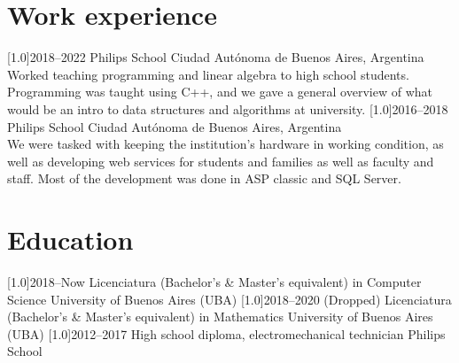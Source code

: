 \documentclass[espanol]{cv-style}     %
\begin{document}
\section{Work experience}
  \vspace{-0.2cm}
\begin{entrylist}
\entry
  {\scalebox{.8}[1.0]{2018--2022}}
  {Philips School}
  {Ciudad Autónoma de Buenos Aires, Argentina}
  {\\
  Worked teaching programming and linear algebra to high school students. Programming was taught
  using C++, and we gave a general overview of what would be an intro to data structures and
  algorithms at university.}
\vspace{-0.3cm}
\entry
  {\scalebox{.8}[1.0]{2016--2018}}
  {Philips School}
  {Ciudad Autónoma de Buenos Aires, Argentina}
  {\\
     We were tasked with keeping the institution's hardware in working condition, as
     well as developing web services for students and families as well as faculty and staff.
     Most of the development was done in ASP classic and SQL Server.}
\end{entrylist}
\section{Education}
  \vspace{-0.2cm}
\begin{entrylist}
\entry
{\scalebox{.8}[1.0]{2018--Now}}
{Licenciatura (Bachelor's \& Master's equivalent) in Computer Science}
{University of Buenos Aires (UBA)}
{}
\entry
{\scalebox{.8}[1.0]{2018--2020 (Dropped) }}
{Licenciatura (Bachelor's \& Master's equivalent) in Mathematics}
{University of Buenos Aires (UBA)}
{}
\entry
{\scalebox{.8}[1.0]{2012--2017}}
{High school diploma, electromechanical technician}
{Philips School}
{}
\end{entrylist}
\end{document}
